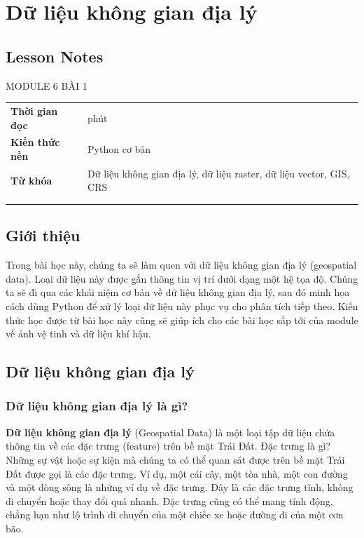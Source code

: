 \chapter{Dữ liệu không gian địa lý}
\label{ch:M6L1LessonNotes}

\section*{Lesson Notes}

MODULE 6 \textbar{} BÀI 1

{\small
\begin{longtable}[]{@{}
  >{\raggedright\arraybackslash}p{}
  >{\raggedright\arraybackslash}p{}@{}}
\toprule\noalign{}
\endhead
\bottomrule\noalign{}
\endlastfoot
\textbf{Thời gian đọc} & 60 phút \\
\textbf{Kiến thức nền} & Python cơ bản \\
\textbf{Từ khóa} & Dữ liệu không gian địa lý, dữ liệu raster, dữ liệu vector, GIS, CRS \\
& \\
& \\
\end{longtable}
}

\section{Giới thiệu}

Trong bài học này, chúng ta sẽ làm quen với dữ liệu không gian địa lý (geospatial data). Loại dữ liệu này được gắn thông tin vị trí dưới dạng một hệ tọa độ. Chúng ta sẽ đi qua các khái niệm cơ bản về dữ liệu không gian địa lý, sau đó minh họa cách dùng Python để xử lý loại dữ liệu này phục vụ cho phân tích tiếp theo. Kiến thức học được từ bài học này cũng sẽ giúp ích cho các bài học sắp tới của module về ảnh vệ tinh và dữ liệu khí hậu.

\section{Dữ liệu không gian địa lý}

\subsection{Dữ liệu không gian địa lý là gì?}

\textbf{Dữ liệu không gian địa lý} (Geospatial Data) là một loại tập dữ liệu chứa thông tin về các đặc trưng (feature) trên bề mặt Trái Đất. Đặc trưng là gì? Những sự vật hoặc sự kiện mà chúng ta có thể quan sát được trên bề mặt Trái Đất được gọi là các đặc trưng. Ví dụ, một cái cây, một tòa nhà, một con đường và một dòng sông là những ví dụ về đặc trưng. Đây là các đặc trưng tĩnh, không di chuyển hoặc thay đổi quá nhanh. Đặc trưng cũng có thể mang tính động, chẳng hạn như lộ trình di chuyển của một chiếc xe hoặc đường đi của một cơn bão.

